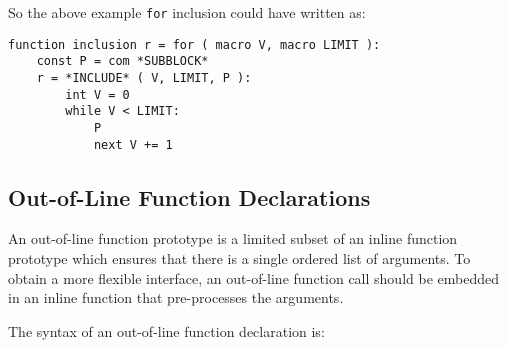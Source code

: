 \documentclass[12pt]{article}
\newenvironment{indpar}[1][0.3in]%
	{\begin{list}{}%
		     {\setlength{\itemsep}{0in}%
		      \setlength{\topsep}{0in}%
		      \setlength{\parsep}{1ex}%
		      \setlength{\labelwidth}{#1}%
		      \setlength{\leftmargin}{#1}%
		      \addtolength{\leftmargin}{\labelsep}}%
	 \item}%
	{\end{list}}
\begin{document}
So the above example {\tt for} inclusion could have written as:
\begin{indpar}[1em]\begin{verbatim}
function inclusion r = for ( macro V, macro LIMIT ):
    const P = com *SUBBLOCK*
    r = *INCLUDE* ( V, LIMIT, P ):
        int V = 0
        while V < LIMIT:
            P
            next V += 1
\end{verbatim}\end{indpar}


\subsection{Out-of-Line Function Declarations}
\label{OUT-OF-LINE-FUNCTION-DECLARATIONS}

An out-of-line function prototype is a limited subset of
an inline function prototype which ensures that there is
a single ordered list of arguments.  To obtain a more
flexible interface, an out-of-line function call should
be embedded in an inline function that pre-processes the
arguments.

The syntax of an out-of-line function declaration is:
\end{document}
